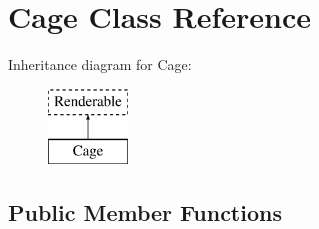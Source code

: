 \hypertarget{class_cage}{}\section{Cage Class Reference}
\label{class_cage}
Inheritance diagram for Cage\+:\begin{figure}[H]
\begin{center}
\leavevmode
\includegraphics[height=2.000000cm]{class_cage}
\end{center}
\end{figure}
\subsection*{Public Member Functions}
